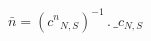 \documentclass[border=1pt]{standalone}
\begin{document}
${\bar n}=\left( {c^n}{_{N, S}} \right)^{-1} \, . \, {{\_c}}{_{N, S}}$
\end{document}
